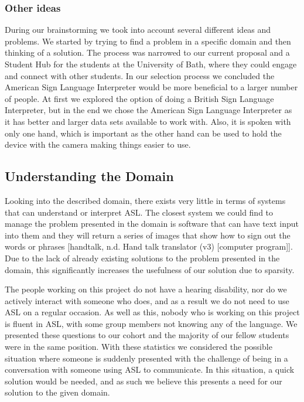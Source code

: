 \documentclass[10pt]{article}
\begin{document}
\subsubsection{Other ideas}

During our brainstorming we took into account several different ideas and problems. We started by 
trying to find a problem in a specific domain and then thinking of a solution. The process was 
narrowed to our current proposal and a Student Hub for the students at the University of Bath, where 
they could engage and connect with other students. In our selection process we concluded the 
American Sign Language Interpreter would be more beneficial to a larger number of 
people. At first we explored the option of doing a British Sign Language Interpreter, but in the end we 
chose the American Sign Language Interpreter as it has better and larger data sets available to 
work with. Also, it is spoken with only one hand, which is important as the other hand can be used to 
hold the device with the camera making things easier to use. 

\subsection{Understanding the Domain}

Looking into the described domain, there exists very little in terms of systems that can understand 
or interpret ASL. The closest system we could find to manage the problem presented in the domain is 
software that can have text input into them and they will return a series of images that show how to 
sign out the words or phrases [handtalk, n.d. Hand talk translator (v3) [computer program]]. Due to 
the lack of already existing solutions to the problem presented in the domain, this significantly 
increases the usefulness of our solution due to sparsity.

The people working on this project do not have a hearing disability, nor do we actively interact 
with someone who does, and as a result we do not need to use ASL on a regular occasion. As well as 
this, nobody who is working on this project is fluent in ASL, with some group members not knowing 
any of the language. We presented these questions to our cohort and the majority of our fellow 
students were in the same position. With these statistics we considered the possible situation 
where someone is suddenly presented with the challenge of being in a conversation with someone using ASL
to communicate. In this situation, a quick solution would be needed, and as such we believe this presents 
a need for our solution to the given domain.
\end{document}
